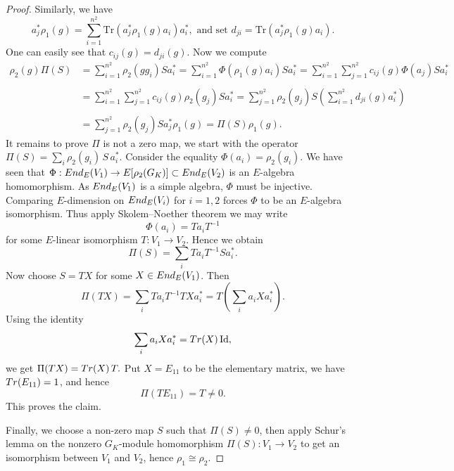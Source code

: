 \documentclass[10pt,a4paper]{amsart}
\begin{document}
\begin{proof}
Similarly, we have \begin{equation}
a_j^* \rho_1(g) = \sum_{i=1}^{n^2} \text{Tr}(a_j^* \rho_1(g) a_i) a_i^* \tag{2}, \textrm{ and set }d_{ji}=\text{Tr}(a_j^* \rho_1(g) a_i).\end{equation}
One can easily see that $c_{ij}(g)=d_{ji}(g)$. Now we compute
$$
\begin{array}{ll}
\rho_2(g)\Pi(S)&=\sum_{i=1}^{n^2}\rho_2(gg_i)Sa_i^*=\sum_{i=1}^{n^2}\Phi(\rho_1(g)a_i)Sa_i^*=\sum_{i=1}^{n^2}\sum_{j=1}^{n^2}c_{ij}(g)\Phi(a_j)Sa_i^*\\
&\ \\
&=\sum_{i=1}^{n^2}\sum_{j=1}^{n^2}c_{ij}(g)\rho_2(g_j)Sa_i^*=\sum_{j=1}^{n^2}\rho_2(g_j)S\left(\sum_{i=1}^{n^2} d_{ji}(g)a_i^*\right)\\
&\ \\
&=\sum_{j=1}^{n^2}\rho_2(g_j)Sa_j^*\rho_1(g)=\Pi(S)\rho_1(g).
\end{array}
$$
It remains to prove $\Pi$ is not a zero map, we start with the operator $\Pi(S)=\sum_i \rho_2(g_i)\, S\, a_i^\ast.$
Consider the equality $\Phi(a_i)=\rho_2(g_i)$. We have seen that $\Phi:{\rm End}_E(V_1)\rightarrow E[\rho_2(G_K)]\subset {\rm End}_E(V_2)$ is an $E$-algebra homomorphism. As ${\rm End}_E(V_1)$ is a simple algebra, $\Phi$ must be injective. Comparing $E$-dimension on ${\rm End}_E(V_i)$ for $i=1,2$ forces $\Phi$ to be an $E$-algebra isomorphism. Thus apply Skolem--Noether theorem we may write
\[
\Phi(a_i)=Ta_iT^{-1}
\]
for some $E$-linear isomorphism $T:V_1 \to V_2$. Hence we obtain
\[
\Pi(S)=\sum_i T a_i T^{-1} S a_i^\ast.
\]
Now choose $S = TX$ for some $X \in {\rm End}_E(V_1)$. Then
\[
\Pi(TX)
=
\sum_i T a_i T^{-1} T X a_i^\ast
=
T\left(\sum_i a_i X a_i^\ast\right).
\]
Using the identity
$$\sum_i a_i X a_i^\ast = {\rm Tr}(X)\,\mathrm{Id},$$
we get $\Pi(TX)={\rm Tr}(X)\,T.$ Put $X=E_{11}$ to be the elementary matrix, we have ${\rm Tr}(E_{11})=1$, and hence
\[
\Pi(T E_{11}) = T \neq 0.
\]
This proves the claim.

Finally, we choose a  non-zero map $S$ such that $\Pi(S)\neq0$, then apply Schur's lemma on the nonzero $G_K$-module homomorphism $\Pi(S):V_1\rightarrow V_2$ to get an isomorphism between $V_1$ and $V_2$, hence $\rho_1\cong\rho_2$.



\end{proof}
\end{document}
